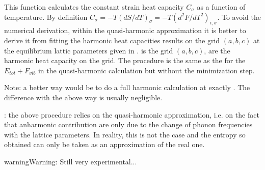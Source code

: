 \documentclass[letterpaper,10pt,english]{sphinxmanual}
\begin{document}
\begin{fulllineitems}
\label{pyqha:pyqha.properties_anis.compute_Csigma}
This function calculates the constant strain heat capacity \(C_{\sigma}\)
as a function of temperature. 
By definition \(C_{\sigma} = -T(dS/dT)_{\sigma}=-T(d^2F/dT^2)_{\epsilon,\sigma}\). 
To avoid the numerical derivation, within the quasi-harmonic
approximation it is better to derive it from fitting the harmonic heat capacities
results on the grid \((a,b,c)\) at the equilibrium lattic parameters given
in .  is the grid \((a,b,c)\),  are the harmonic 
heat capacity on the grid.
The procedure is the same as the for the \(E_{tot}+F_{vib}\) in the quasi-harmonic
calculation but without the minimization step.

Note: a better way would be to do a full harmonic calculation at exactly .
The difference with the above way is usually negligible.

: the above procedure relies on the quasi-harmonic approximation,
i.e. on the fact that anharmonic contribution are only due to the change of
phonon frequencies with the lattice parameters. In reality, this is not the 
case and the entropy so obtained can only be taken as an approximation of the
real one.

\begin{sphinxadmonition}{warning}{Warning:}
Still very experimental...
\end{sphinxadmonition}

\end{fulllineitems}

\end{document}
